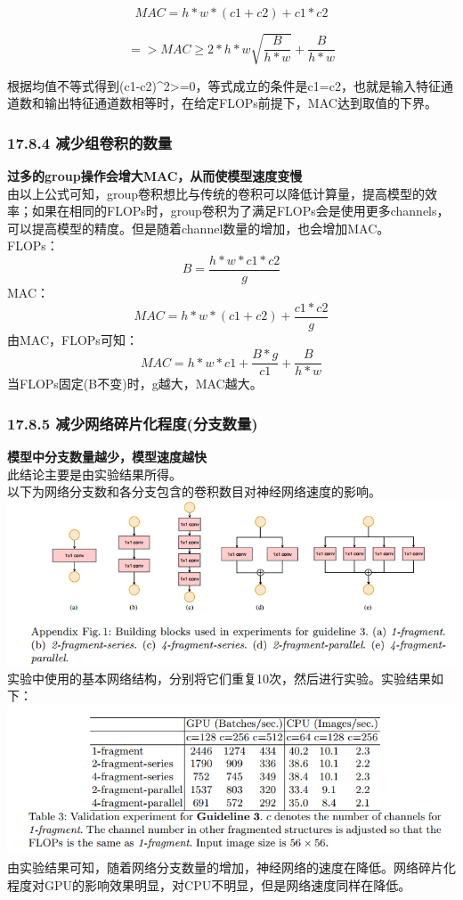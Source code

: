 \[
MAC = h * w * (c1 + c2) + c1 * c2  
\]

\[
=> MAC \geq 2 * h * w \sqrt{\dfrac{B}{h * w}} + \dfrac{B}{h * w}
\]

根据均值不等式得到(c1-c2)\^{}2\textgreater{}=0，等式成立的条件是c1=c2，也就是输入特征通道数和输出特征通道数相等时，在给定FLOPs前提下，MAC达到取值的下界。

\subsubsection{17.8.4
减少组卷积的数量}\label{ux51cfux5c11ux7ec4ux5377ux79efux7684ux6570ux91cf}

\textbf{过多的group操作会增大MAC，从而使模型速度变慢}\\
由以上公式可知，group卷积想比与传统的卷积可以降低计算量，提高模型的效率；如果在相同的FLOPs时，group卷积为了满足FLOPs会是使用更多channels，可以提高模型的精度。但是随着channel数量的增加，也会增加MAC。\\
FLOPs： \[
B = \dfrac{h * w * c1 * c2}{g}
\] MAC： \[
MAC = h * w * (c1 + c2) + \dfrac{c1 * c2}{g}
\] 由MAC，FLOPs可知： \[
MAC = h * w * c1 + \dfrac{B*g}{c1} + \dfrac{B}{h * w}
\] 当FLOPs固定(B不变)时，g越大，MAC越大。

\subsubsection{17.8.5
减少网络碎片化程度(分支数量)}\label{ux51cfux5c11ux7f51ux7edcux788eux7247ux5316ux7a0bux5ea6ux5206ux652fux6570ux91cf}

\textbf{模型中分支数量越少，模型速度越快}\\
此结论主要是由实验结果所得。\\
以下为网络分支数和各分支包含的卷积数目对神经网络速度的影响。\\
\includegraphics{./img/ch17/6.png}
实验中使用的基本网络结构，分别将它们重复10次，然后进行实验。实验结果如下：
\includegraphics{./img/ch17/7.png}
由实验结果可知，随着网络分支数量的增加，神经网络的速度在降低。网络碎片化程度对GPU的影响效果明显，对CPU不明显，但是网络速度同样在降低。

